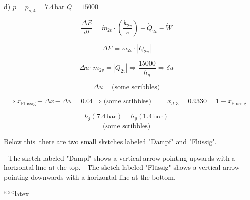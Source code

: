 d) $p = p_{s,4} = 7.4 \, \text{bar}$ \hspace{1cm} $Q = 15000$

\[
\frac{\Delta E}{dt} = \dot{m}_{2v} \cdot \left( \frac{h_{2v}}{v} \right) + \dot{Q}_{2v} - \dot{W}
\]

\[
\Delta E = \dot{m}_{2v} \cdot \left| Q_{2v} \right|
\]

\[
\Delta u \cdot m_{2v} = \left| Q_{2v} \right| \Rightarrow \frac{15000}{h_{g}} \Rightarrow \delta u
\]

\[
\Delta u = \text{(some scribbles)}
\]

\[
\Rightarrow \dot{x}_{\text{Flüssig}} + \Delta x - \Delta u = 0.04 \Rightarrow \text{(some scribbles)} \hspace{1cm} x_{d,3} = 0.9330 = 1 - x_{\text{Flüssig}}
\]

\[
\frac{h_{g} (7.4 \, \text{bar}) - h_{g} (1.4 \, \text{bar})}{\text{(some scribbles)}}
\]

Below this, there are two small sketches labeled "Dampf" and "Flüssig". 

- The sketch labeled "Dampf" shows a vertical arrow pointing upwards with a horizontal line at the top. 
- The sketch labeled "Flüssig" shows a vertical arrow pointing downwards with a horizontal line at the bottom.

``````latex